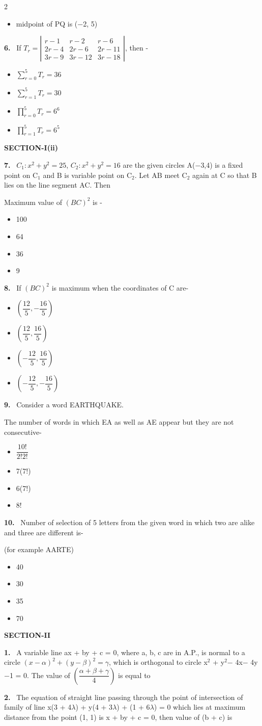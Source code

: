 \documentclass[10pt]{extarticle}
\newcommand{\sect}[1]{\par\smallskip\noindent\textbf{#1}\par}
\newcommand{\qn}[1]{\par\smallskip\noindent\textbf{#1.}~}
\newenvironment{qoptions}{\begin{itemize}[leftmargin=1.8em,itemsep=1pt,topsep=2pt,label={}]}{\end{itemize}}
\newcommand{\opt}[2]{\item[(#1)] #2}
\begin{document}
\begin{multicols}{2}
\begin{qoptions}
\opt{D}{midpoint of PQ is ($-$2, 5)}
\end{qoptions}
\qn{6} If $T_r=\left|\begin{array}{ccc}r-1&r-2&r-6\\2r-4&2r-6&2r-11\\3r-9&3r-12&3r-18\end{array}\right|$, then -
\begin{qoptions}
\opt{A}{$\displaystyle\sum_{r=0}^{5}T_r=36$}
\opt{B}{$\displaystyle\sum_{r=1}^{5}T_r=30$}
\opt{C}{$\displaystyle\prod_{r=0}^{5}T_r=6^6$}
\opt{D}{$\displaystyle\prod_{r=1}^{5}T_r=6^5$}
\end{qoptions}
\sect{SECTION-I(ii)}
\qn{7} $C_1:x^2+y^2=25$, $C_2:x^2+y^2=16$ are the given circles A($-$3,4) is a fixed point on C$_1$ and B is variable point on C$_2$. Let AB meet C$_2$ again at C so that B lies on the line segment AC. Then\par
Maximum value of $(BC)^2$ is -
\begin{qoptions}
\opt{A}{100}
\opt{B}{64}
\opt{C}{36}
\opt{D}{9}
\end{qoptions}
\qn{8} If $(BC)^2$ is maximum when the coordinates of C are-
\begin{qoptions}
\opt{A}{$\left(\dfrac{12}5,-\dfrac{16}5\right)$}
\opt{B}{$\left(\dfrac{12}5,\dfrac{16}5\right)$}
\opt{C}{$\left(-\dfrac{12}5,\dfrac{16}5\right)$}
\opt{D}{$\left(-\dfrac{12}5,-\dfrac{16}5\right)$}
\end{qoptions}
\qn{9} Consider a word EARTHQUAKE.\par
The number of words in which EA as well as AE appear but they are not consecutive-
\begin{qoptions}
\opt{A}{$\dfrac{10!}{2!2!}$}
\opt{B}{7(7!)}
\opt{C}{6(7!)}
\opt{D}{8!}
\end{qoptions}
\qn{10} Number of selection of 5 letters from the given word in which two are alike and three are different is-\par
(for example AARTE)
\begin{qoptions}
\opt{A}{40}
\opt{B}{30}
\opt{C}{35}
\opt{D}{70}
\end{qoptions}
\sect{SECTION-II}
\qn{1} A variable line ax + by + c = 0, where a, b, c are in A.P., is normal to a circle $(x-\alpha)^2+(y-\beta)^2=\gamma$, which is orthogonal to circle x$^2$ + y$^2$$-$ 4x$-$ 4y$-$1 = 0. The value of $\left(\dfrac{\alpha+\beta+\gamma}{4}\right)$ is equal to
\qn{2} The equation of straight line passing through the point of intersection of family of line x(3 + 4$\lambda$) + y(4 + 3$\lambda$) + (1 + 6$\lambda$) = 0 which lies at maximum distance from the point (1, 1) is x + by + c = 0, then value of (b + c) is
$$
\end{multicols}
\end{document}
